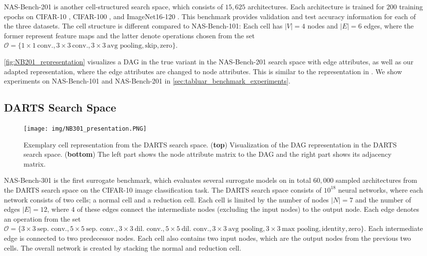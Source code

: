\documentclass[runningheads]{llncs}
\begin{document}
NAS-Bench-201 \cite{2020NB201} is another 
cell-structured search space, which consists of $15,625$ architectures.
Each architecture is trained for $200$ training epochs
on CIFAR-10 \cite{2009CIFAR}, CIFAR-100 \cite{2009CIFAR}, and ImageNet16-120 \cite{2017ImageNet16}.
This benchmark provides validation and test accuracy information for each of the three datasets.
The cell structure is different compared to NAS-Bench-101: Each cell has $\vert V \vert = 4$ nodes and $\vert E \vert = 6$ edges, where the former represent
feature maps and the latter denote operations chosen from the set $\mathcal{O} = \{1 \times 1~\textrm{conv.}, 3 \times 3~\textrm{conv.}, 3 \times 3~\textrm{avg pooling}, \textrm{skip}, \textrm{zero}\}$.

\autoref{fig:NB201_representation} visualizes a DAG in the true variant in the NAS-Bench-201 search space with edge attributes, as well as our adapted representation, where the edge attributes are changed to node attributes. This is similar to the representation in \cite{2020Arch2vec}.
We show experiments on NAS-Bench-101 and NAS-Bench-201 in \autoref{sec:tabluar_benchmark_experiments}.

\subsection{DARTS Search Space}
\begin{figure*}
	\centering
	\texttt{[image: img/NB301\_presentation.PNG]}
	\caption{Exemplary cell representation from the DARTS search space. (\textbf{top}) Visualization of the DAG representation in the DARTS search space. (\textbf{bottom}) The left part shows the node attribute matrix to the DAG and the right part shows its adjacency matrix. \label{fig:NB301_representation}}
\end{figure*}
NAS-Bench-301 \cite{2020NB301} is the first surrogate benchmark, which evaluates several surrogate models on in total $60,000$ sampled architectures from the DARTS \cite{2018DARTS} search space on the CIFAR-10 \cite{2009CIFAR}
image classification task. 
The DARTS search space consists of $10^{18}$ neural networks, where each network consists of two cells; a normal cell and a reduction cell.  Each cell is limited by the number of nodes $\vert N \vert = 7$ and the number of edges $\vert E \vert = 12$, where $4$ of these edges connect the intermediate nodes (excluding the input nodes) to the output node. Each edge denotes an operation from the set  $\mathcal{O} = \{3 \times 3~\textrm{sep. conv.}, 5 \times 5~\textrm{sep. conv.}, 3 \times 3~\textrm{dil. conv.}, 5 \times 5~\textrm{dil. conv.},  3 \times 3~\textrm{avg pooling}, 3 \times 3~\textrm{max pooling}, \textrm{identity}, \textrm{zero}\}$. Each intermediate edge is connected to two predecessor nodes. Each cell also contains two input nodes, which are the output nodes from the previous two cells. The overall network is created by stacking the normal and reduction cell.
\end{document}
